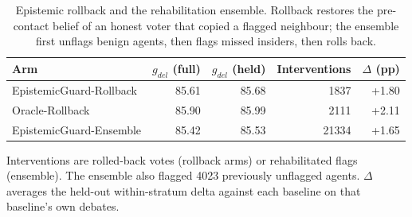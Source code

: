 \begin{table}[htbp]
\centering
\small
\caption{Epistemic rollback and the rehabilitation ensemble. Rollback restores the pre-contact belief of an honest voter that copied a flagged neighbour; the ensemble first unflags benign agents, then flags missed insiders, then rolls back.}
\label{tab:rollback}
\begin{tabular}{lrrrr}
\toprule
Arm & $g_{del}$ (full) & $g_{del}$ (held) & Interventions & $\Delta$ (pp) \\
\midrule
EpistemicGuard-Rollback & 85.61 & 85.68 & 1837 & +1.80 \\
Oracle-Rollback & 85.90 & 85.99 & 2111 & +2.11 \\
EpistemicGuard-Ensemble & 85.42 & 85.53 & 21334 & +1.65 \\
\bottomrule
\end{tabular}
\par\smallskip\footnotesize Interventions are rolled-back votes (rollback arms) or rehabilitated flags (ensemble). The ensemble also flagged 4023 previously unflagged agents. $\Delta$ averages the held-out within-stratum delta against each baseline on that baseline's own debates.
\end{table}
